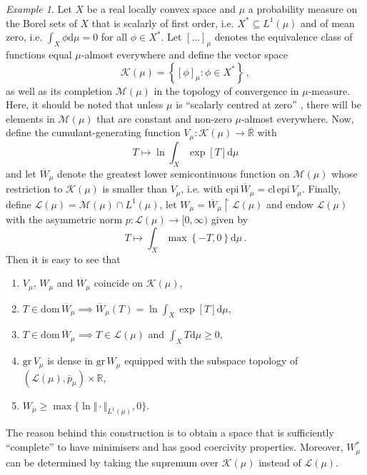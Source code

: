 \documentclass[
	paper=A4,
	pagesize=auto,
	fontsize=12pt
]{scrartcl}
\theoremstyle{plain}
\theoremstyle{remark}
\newtheorem{example}[theorem]{Example}
\theoremstyle{definition}
\begin{document}
\begin{example}
Let $X$ be a real locally convex space and $\mu$ a probability measure on the Borel sets of $X$ that is scalarly of first order, i.e. $X^* \subseteq L^1(\mu)$ and of mean zero, i.e. $\int_X \phi \mathrm{d} \mu = 0$ for all $\phi \in X^*$.
Let $[\dots]_\mu$ denotes the equivalence class of functions equal $\mu$-almost everywhere and define the vector space
%
\begin{equation}
\mathcal{K}(\mu)
=
\left\{
\left[ \phi \right]_\mu : \phi \in X^*
\right\} \, ,
\end{equation}
%
as well as its completion $\mathcal{M}(\mu)$ in the topology of convergence in $\mu$-measure.
Here, it should be noted that unless $\mu$ is \enquote{scalarly centred at zero} \cite[Theorem 2]{src:Chevet:KernelOfCylindricalMeasures}, there will be elements in $\mathcal{M}(\mu)$ that are constant and non-zero $\mu$-almost everywhere.
Now, define the cumulant-generating function $V_\mu : \mathcal{K}(\mu) \to \overline{\mathbb{R}}$ with
%
\begin{equation}
\label{eq:VMuDefinition}
T \mapsto \ln \int_X \exp \left[ T \right] \mathrm{d} \mu
\end{equation}
%
and let $\overline{W}_\mu$ denote the greatest lower semicontinuous function on $\mathcal{M}(\mu)$ whose restriction to $\mathcal{K}(\mu)$ is smaller than $V_\mu$, i.e. with $\mathrm{epi}\, \overline{W}_\mu = \mathrm{cl}\, \mathrm{epi}\, V_\mu$.
Finally, define $\mathcal{L}(\mu) = \mathcal{M}(\mu) \cap L^1(\mu)$, let $W_\mu = \overline{W}_\mu \upharpoonright \mathcal{L}(\mu)$ and endow $\mathcal{L}(\mu)$ with the asymmetric norm $p : \mathcal{L}(\mu) \to [0, \infty)$ given by
%
\begin{equation}
T \mapsto \int_X \max \left\{ -T, 0 \right\} \mathrm{d} \mu \, .
\end{equation}
%
Then it is easy to see that
%
\begin{enumerate}
\item $V_\mu$, $W_\mu$ and $\overline{W}_\mu$ coincide on $\mathcal{K}(\mu)$,
\item $T \in \mathrm{dom}\, \overline{W}_\mu \implies \overline{W}_\mu(T) = \ln \int_X \exp[T] \mathrm{d} \mu$,
\item $T \in \mathrm{dom}\, \overline{W}_\mu \implies T \in \mathcal{L}(\mu)$ and $\int_X T \mathrm{d} \mu \ge 0$,
\item $\mathrm{gr}\, V_\mu$ is dense in $\mathrm{gr}\, W_\mu$ equipped with the subspace topology of $(\mathcal{L}(\mu), \bar{p}_\mu) \times \mathbb{R}$,
\item $W_\mu \ge \max \{ \ln \Vert \cdot \Vert_{L^1(\mu)}, 0 \}$.
\end{enumerate}
%
The reason behind this construction is to obtain a space that is sufficiently \enquote{complete} to have minimisers and has good coercivity properties.
Moreover, $W_\mu^*$ can be determined by taking the supremum over $\mathcal{K}(\mu)$ instead of $\mathcal{L}(\mu)$.


\end{example}
\end{document}
